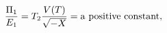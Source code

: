 \begin{equation}\label{2tv}
\frac{\Pi_{1}}{E_{1}}=T_{2}\frac{V(T)}{\sqrt{-X}}={\rm a~positive~constant},
\end{equation}

